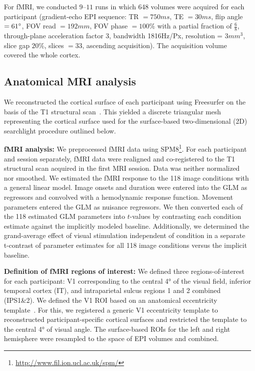 \documentclass[10pt,twocolumn,letterpaper]{article}
\begin{document}
For fMRI, we conducted $9–11$ runs in which 648 volumes were acquired for each participant (gradient-echo EPI sequence: TR $= 750 ms$, TE $= 30 ms$, flip angle $= 61\degree$, FOV read $= 192 mm$, FOV phase $= 100\%$ with a partial fraction of $\frac{6}{8}$, through-plane acceleration factor 3, bandwidth 1816Hz/Px, resolution = $3mm^3$, slice gap $20\%$, slices $= 33$, ascending acquisition). The acquisition volume covered the whole cortex.

\subsection{Anatomical MRI analysis}
We reconstructed the cortical surface of each participant using Freesurfer on the basis of the T1 structural scan~\cite{dale1999cortical}. This yielded a discrete triangular mesh representing the cortical surface used for the surface-based two-dimensional (2D) searchlight procedure outlined below.

\textbf{fMRI analysis:}
We preprocessed fMRI data using SPM8\footnote{\href{http://www.fil.ion.ucl.ac.uk/spm/}{http://www.fil.ion.ucl.ac.uk/spm/}}. For each participant and session separately, fMRI data were realigned and co-registered to the T1 structural scan acquired in the first MRI session. Data was neither normalized nor smoothed. We estimated the fMRI response to the 118 image conditions with a general linear model. Image onsets and duration were entered into the GLM as regressors and convolved with a hemodynamic response function. Movement parameters entered the GLM as nuisance regressors. We then converted each of the 118 estimated GLM parameters into $t$-values by contrasting each condition estimate against the implicitly modeled baseline. Additionally, we determined the grand-average effect of visual stimulation independent of condition in a separate t-contrast of parameter estimates for all 118 image conditions versus the implicit baseline.

\textbf{Definition of fMRI regions of interest:}
We defined three regions-of-interest for each participant: V1 corresponding to the central 4° of the visual field, inferior temporal cortex (IT), and intraparietal sulcus regions 1 and 2 combined (IPS1\&2). We defined the V1 ROI based on an anatomical eccentricity template~\cite{benson2012retinotopic}. For this, we registered a generic V1 eccentricity template to reconstructed participant-specific cortical surfaces and restricted the template to the central 4° of visual angle. The surface-based ROIs for the left and right hemisphere were resampled to the space of EPI volumes and combined.
\end{document}
